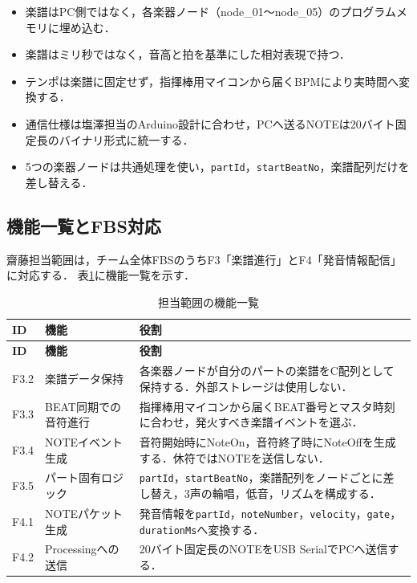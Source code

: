 \documentclass[uplatex,dvipdfmx]{jlreq}
\newcommand{\code}[1]{\texttt{#1}}
\begin{document}
\begin{itemize}
  \item 楽譜はPC側ではなく，各楽器ノード（node\_01〜node\_05）のプログラムメモリに埋め込む．
  \item 楽譜はミリ秒ではなく，音高と拍を基準にした相対表現で持つ．
  \item テンポは楽譜に固定せず，指揮棒用マイコンから届くBPMにより実時間へ変換する．
  \item 通信仕様は塩澤担当のArduino設計に合わせ，PCへ送るNOTEは20バイト固定長のバイナリ形式に統一する．
  \item 5つの楽器ノードは共通処理を使い，\code{partId}，\code{startBeatNo}，楽譜配列だけを差し替える．
\end{itemize}

\subsection{機能一覧とFBS対応}

齋藤担当範囲は，チーム全体FBSのうちF3「楽譜進行」とF4「発音情報配信」に対応する．
表\ref{tab:functions}に機能一覧を示す．

\begin{longtable}{p{}p{}p{}}
\caption{担当範囲の機能一覧}\label{tab:functions}\\
\toprule
\textbf{ID} & \textbf{機能} & \textbf{役割} \\
\midrule
\endfirsthead
\toprule
\textbf{ID} & \textbf{機能} & \textbf{役割} \\
\midrule
\endhead
F3.2 & 楽譜データ保持 &
各楽器ノードが自分のパートの楽譜をC配列として保持する．外部ストレージは使用しない．\\
F3.3 & BEAT同期での音符進行 &
指揮棒用マイコンから届くBEAT番号とマスタ時刻に合わせ，発火すべき楽譜イベントを選ぶ．\\
F3.4 & NOTEイベント生成 &
音符開始時にNoteOn，音符終了時にNoteOffを生成する．休符ではNOTEを送信しない．\\
F3.5 & パート固有ロジック &
\code{partId}，\code{startBeatNo}，楽譜配列をノードごとに差し替え，3声の輪唱，低音，リズムを構成する．\\
F4.1 & NOTEパケット生成 &
発音情報を\code{partId}，\code{noteNumber}，\code{velocity}，\code{gate}，
\code{durationMs}へ変換する．\\
F4.2 & Processingへの送信 &
20バイト固定長のNOTEをUSB SerialでPCへ送信する．\\
\bottomrule
\end{longtable}
\end{document}
